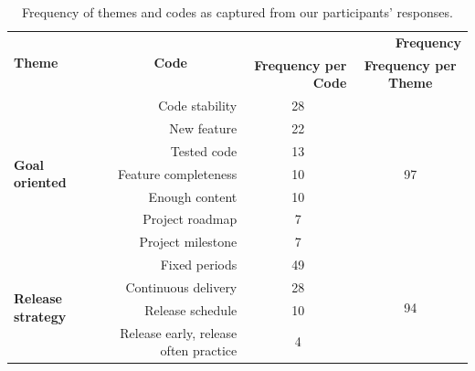 \begin{table}
	\centering
	\caption{Frequency of themes and codes as captured from our participants' responses.}
	\begin{tabular}{p{8.915em}rrc}
		\hline
		\multirow{2}[4]{*}{\textbf{Theme}} & \multicolumn{1}{c}{\multirow{2}[4]{*}{\textbf{Code}}} & \multicolumn{2}{p{9.33em}}{\textbf{Frequency}} \bigstrut\\
		\cline{3-4}    \multicolumn{1}{c}{} &       & \multicolumn{1}{p{4.665em}}{\textbf{Frequency per Code}} & \multicolumn{1}{p{4.665em}}{\textbf{Frequency per Theme}} \bigstrut\\
		\hline
		\multirow{7}[14]{*}{\textbf{Goal oriented}} & \multicolumn{1}{p{11.915em}}{Code stability} & \multicolumn{1}{c}{28} & \multirow{7}[14]{*}{97} \bigstrut\\
		\cline{2-3}    \multicolumn{1}{c}{} & \multicolumn{1}{p{11.915em}}{New feature} & \multicolumn{1}{c}{22} &  \bigstrut\\
		\cline{2-3}    \multicolumn{1}{c}{} & \multicolumn{1}{p{11.915em}}{Tested code} & \multicolumn{1}{c}{13} &  \bigstrut\\
		\cline{2-3}    \multicolumn{1}{c}{} & \multicolumn{1}{p{11.915em}}{Feature completeness} & \multicolumn{1}{c}{10} &  \bigstrut\\
		\cline{2-3}    \multicolumn{1}{c}{} & \multicolumn{1}{p{11.915em}}{Enough content} & \multicolumn{1}{c}{10} &  \bigstrut\\
		\cline{2-3}    \multicolumn{1}{c}{} & \multicolumn{1}{p{11.915em}}{Project roadmap} & \multicolumn{1}{c}{7} &  \bigstrut\\
		\cline{2-3}    \multicolumn{1}{c}{} & \multicolumn{1}{p{11.915em}}{Project milestone} & \multicolumn{1}{c}{7} &  \bigstrut\\
		\hline
		\multirow{5}[10]{*}{\textbf{Release strategy}} & \multicolumn{1}{p{11.915em}}{Fixed periods} & \multicolumn{1}{c}{49} & \multirow{5}[10]{*}{94} \bigstrut\\
		\cline{2-3}    \multicolumn{1}{c}{} & \multicolumn{1}{p{11.915em}}{Continuous delivery} & \multicolumn{1}{c}{28} &  \bigstrut\\
		\cline{2-3}    \multicolumn{1}{c}{} & \multicolumn{1}{p{11.915em}}{Release schedule} & \multicolumn{1}{c}{10} &  \bigstrut\\
		\cline{2-3}    \multicolumn{1}{c}{} & \multicolumn{1}{p{11.915em}}{Release early, release often practice} & \multicolumn{1}{c}{4} &  \bigstrut\\

\end{tabular}
\end{table}
